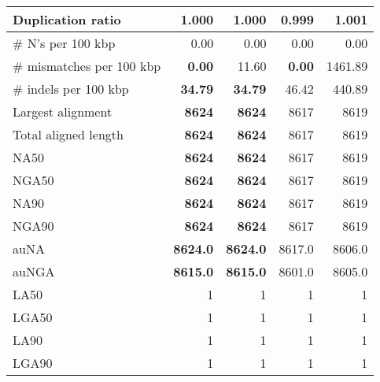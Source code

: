 \documentclass[12pt,a4paper]{article}
\begin{document}
\begin{table}[ht]
\begin{center}
\begin{tabular}{|l*{4}{|r}|}
Duplication ratio & 1.000 & 1.000 & {\bf 0.999} & 1.001 \\ \hline
\# N's per 100 kbp & 0.00 & 0.00 & 0.00 & 0.00 \\ \hline
\# mismatches per 100 kbp & {\bf 0.00} & 11.60 & {\bf 0.00} & 1461.89 \\ \hline
\# indels per 100 kbp & {\bf 34.79} & {\bf 34.79} & 46.42 & 440.89 \\ \hline
Largest alignment & {\bf 8624} & {\bf 8624} & 8617 & 8619 \\ \hline
Total aligned length & {\bf 8624} & {\bf 8624} & 8617 & 8619 \\ \hline
NA50 & {\bf 8624} & {\bf 8624} & 8617 & 8619 \\ \hline
NGA50 & {\bf 8624} & {\bf 8624} & 8617 & 8619 \\ \hline
NA90 & {\bf 8624} & {\bf 8624} & 8617 & 8619 \\ \hline
NGA90 & {\bf 8624} & {\bf 8624} & 8617 & 8619 \\ \hline
auNA & {\bf 8624.0} & {\bf 8624.0} & 8617.0 & 8606.0 \\ \hline
auNGA & {\bf 8615.0} & {\bf 8615.0} & 8601.0 & 8605.0 \\ \hline
LA50 & 1 & 1 & 1 & 1 \\ \hline
LGA50 & 1 & 1 & 1 & 1 \\ \hline
LA90 & 1 & 1 & 1 & 1 \\ \hline
LGA90 & 1 & 1 & 1 & 1 \\ \hline
\end{tabular}
\end{center}
\end{table}
\end{document}

